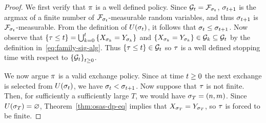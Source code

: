 \begin{proof}
    We first verify that $\pi$ is a well defined policy.
    Since 
    \(
        \mathcal{G}_{t}
        =
        \mathcal{F}_{
            \sigma_{t}
        }
    \),
    \(
        \sigma_{t+1}
    \)
    is the argmax of a finite number of
    \(
        \mathcal{F}_{
            \sigma_{t}
        }
    \)-measurable random variables, 
    and thus 
    \(
        \sigma_{t+1}
    \)
    is
    \(
        \mathcal{F}_{
            \sigma_{t}
        }
    \)-measurable.
    From the definition of 
    \(
        U(
            \sigma_{t}
        )
    \), it follows that
    \(
        \sigma_{t}
        \leq
        \sigma_{t+1}
    \).
    Now observe that 
    \(
        \left\{
            \tau\leq t
        \right\}
        =
        \bigcup_{k=0}^t
        \left\{
            X_{
                \sigma_{k}
            }
            =
            Y_{
                \sigma_{k}
            }
        \right\}
    \)
    and 
    \(
        \left\{
            X_{
                \sigma_{k}
            }
            =
            Y_{
                \sigma_{k}
            }
        \right\}
        \in
        \mathcal{G}_{k}
        \subseteq
        \mathcal{G}_{t}
    \)
    by the definition in~\eqref{eq:family-sig-alg}.
    Thus
    \(
        \left\{
            \tau\leq t
        \right\}
        \in
        \mathcal{G}_{t}
    \)
    so $\tau$ is a well defined stopping time with respect to 
    \(
        \left\{
            \mathcal{G}_{t}
        \right\}_{t\geq 0}
    \).

    We now argue $\pi$ is a valid exchange policy. Since at time $t\geq 0$ the next exchange
    is selected from 
    \(
        U(
            \sigma_{t}
        )
    \),
    we have
    \(
        \sigma_{t} < \sigma_{t+1} 
    \).
    Now suppose that $\tau$ is not finite. Then, for sufficiently a sufficiently large $T$,
    we would have 
    \(
        \sigma_{T}
        =
        \left(
            n,m
        \right)
    \).
    Since 
    \(
        U(
            \sigma_{T}
        )
        =
        \varnothing
    \),
    Theorem~\ref{thm:osas-dp-eq}
    implies that 
    \(
        X_{
            \sigma_{T}
        }
        =
        Y_{
            \sigma_{T}
        }
    \), so $\tau$ is forced to be finite.


\end{proof}
